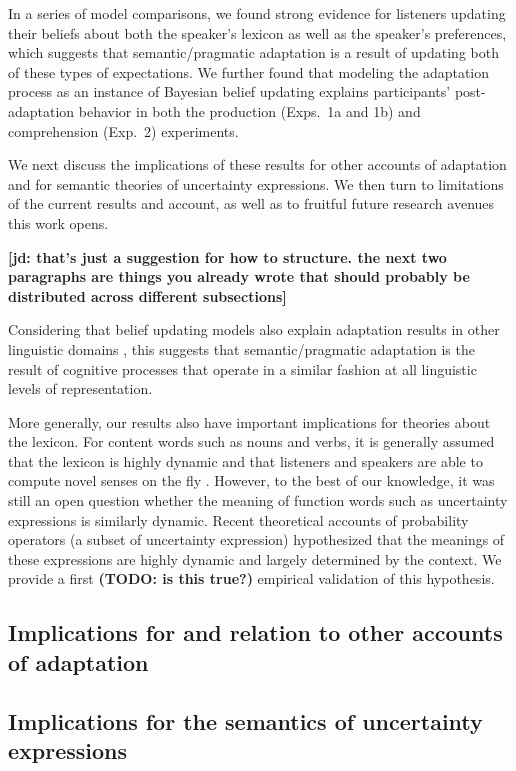 \documentclass[lucida,biblatex]{sp} %
\newcommand{\jd}[1]{\textcolor{PinkyPurple}{\textbf{[jd: #1]}}}
\newcommand{\todo}[1]{}
\renewcommand{\todo}[1]{{\bf \color{red} (TODO: {#1})}}
\begin{document}
In a series of model comparisons, we found strong evidence for listeners updating their beliefs about both the speaker's lexicon as well as the speaker's preferences, which suggests
that semantic/pragmatic adaptation is a result of updating both of these types of expectations. We further found that modeling the adaptation process as an instance of Bayesian
belief updating explains participants' post-adaptation behavior in both the production (Exps.~1a and 1b) and comprehension (Exp.~2) experiments. 


We next discuss the implications of these results for other accounts of adaptation and for semantic theories of uncertainty expressions. We then turn to limitations of the current results and account, as well as to fruitful future research avenues this work opens. 

\jd{that's just a suggestion for how to structure. the next two paragraphs are things you already wrote that should probably be distributed across different subsections}

Considering that belief updating models also explain adaptation results in other linguistic domains 
\citep[e.g.,][]{Kleinschmidt2012,Kleimschmidt2015,Roettger2019}, this suggests that semantic/pragmatic adaptation is the result of cognitive processes that operate in a similar fashion at all
linguistic levels of representation.

More generally, our results also have important implications for theories about the lexicon. For content words such as nouns and verbs, it is generally assumed that 
the lexicon is highly dynamic and that listeners and speakers are able to compute novel senses on the fly \cite[e.g.,][]{Clark1983,ClarkGerrig1983,Griffiths2007?}. 
However, to the best of our knowledge, it was still an open question whether the meaning of function words such as uncertainty expressions is similarly dynamic.
Recent theoretical accounts of probability operators (a subset of uncertainty expression) \cite[e.g.,][]{Yalcin2010,Lassiter2016} hypothesized that the meanings of 
these expressions are highly dynamic and largely determined by the context. We provide a first \todo{is this true?} empirical validation of this hypothesis.


\subsection{Implications for and relation to other accounts of adaptation}

\subsection{Implications for the semantics of uncertainty expressions}
\end{document}

